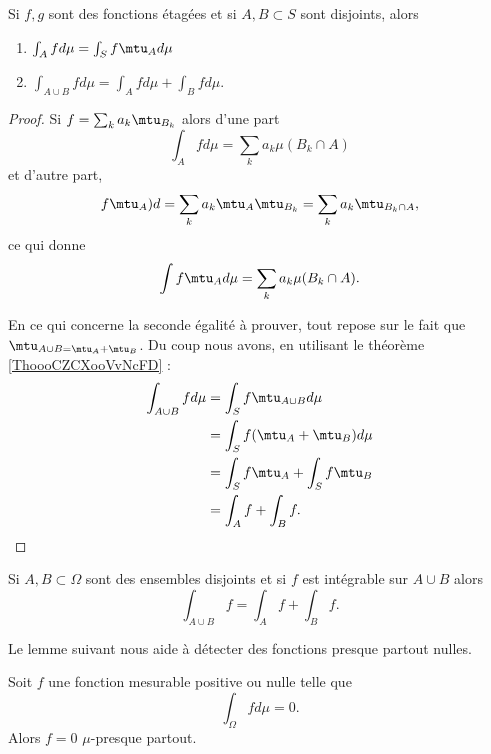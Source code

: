 \begin{proposition}
    Si \( f,g\) sont des fonctions étagées et si \( A,B\subset S\) sont disjoints, alors
    \begin{enumerate}
        \item
            \( \int_Afd\mu=\int_Sf\mtu_Ad\mu\)
        \item
            \( \int_{A\cup B}fd\mu=\int_Afd\mu+\int_Bfd\mu\).
    \end{enumerate}
\end{proposition}

\begin{proof}
    Si \( f=\sum_ka_k\mtu_{B_k}\) alors d'une part
    \begin{equation}
        \int_Afd\mu=\sum_ka_k\mu(B_k\cap A)
    \end{equation}
    et d'autre part,
    \begin{equation}
        f\mtu_A)d=\sum_ka_k\mtu_A\mtu_{B_k}=\sum_ka_k\mtu_{B_k\cap A},
    \end{equation}
    ce qui donne
    \begin{equation}
        \int f\mtu_Ad\mu=\sum_ka_k\mu(B_k\cap A).
    \end{equation}

    En ce qui concerne la seconde égalité à prouver, tout repose sur le fait que \( \mtu_{A\cup B=\mtu_A+\mtu_B}\). Du coup nous avons, en utilisant le théorème \ref{ThoooCZCXooVvNcFD} :
    \begin{subequations}
        \begin{align}
            \int_{A\cup B}fd\mu&=\int_Sf\mtu_{A\cup B}d\mu\\
            &=\int_Sf(\mtu_A+\mtu_B)d\mu\\
            &=\int_Sf\mtu_A+\int_Sf\mtu_B\\
            &=\int_Af+\int_Bf.
        \end{align}
    \end{subequations}
\end{proof}

\begin{proposition}     \label{PropOPSCooVpzaBt}
    Si \( A,B\subset \Omega\) sont des ensembles disjoints et si \( f\) est intégrable sur \( A\cup B\) alors
    \begin{equation}
        \int_{A\cup B}f=\int_Af+\int_Bf.
    \end{equation}
\end{proposition}

Le lemme suivant nous aide à détecter des fonctions presque partout nulles.
\begin{lemma}   \label{Lemfobnwt}
    Soit \( f\) une fonction mesurable positive ou nulle telle que
    \begin{equation}
        \int_{\Omega}fd\mu=0.
    \end{equation}
    Alors \( f=0\) \( \mu\)-presque partout.
\end{lemma}

